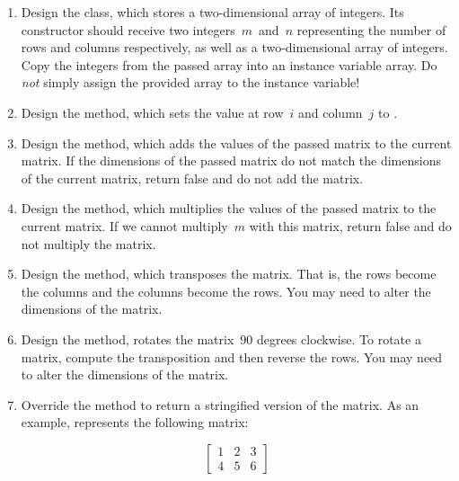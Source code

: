
\begin{enumerate}[label=(\alph*)]
    \item Design the  class, which stores a two-dimensional array of integers. Its constructor should receive two integers~$m$~and~$n$ representing the number of rows and columns respectively, as well as a two-dimensional array of integers. Copy the integers from the passed array into an instance variable array. Do \emph{not} simply assign the provided array to the instance variable!
    \item Design the  method, which sets the value at row~$i$ and column~$j$ to .
    \item Design the  method, which adds the values of the passed matrix to the current matrix. If the dimensions of the passed matrix do not match the dimensions of the current matrix, return false and do not add the matrix.
    \item Design the  method, which multiplies the values of the passed matrix to the current matrix. If we cannot multiply~$m$ with this matrix, return false and do not multiply the matrix.
    \item Design the  method, which transposes the matrix. That is, the rows become the columns and the columns become the rows. You may need to alter the dimensions of the matrix.
    \item Design the  method, rotates the matrix~$90$ degrees clockwise. To rotate a matrix, compute the transposition and then reverse the rows. You may need to alter the dimensions of the matrix.
    \item Override the  method to return a stringified version of the matrix. As an example, \ttt{[[1, 2, 3], [4, 5, 6]]} represents the following matrix:

    \[
    \begin{bmatrix}
      1&2&3\\
      4&5&6
    \end{bmatrix}
    \]
\end{enumerate}


